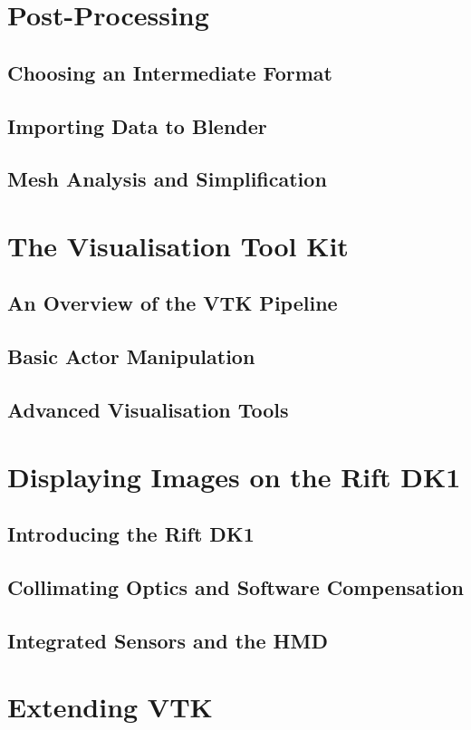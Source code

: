 \documentclass[MSc,paper=a4,pagesize=auto, doublespacing]{icldt}
\begin{document}
\chapter{Post-Processing}
\section{Choosing an Intermediate Format}
\section{Importing Data to Blender}
\section{Mesh Analysis and Simplification}

\chapter{The Visualisation Tool Kit}
\section{An Overview of the VTK Pipeline}
\section{Basic Actor Manipulation}
\section{Advanced Visualisation Tools}

\chapter{Displaying Images on the Rift DK1}
\section{Introducing the Rift DK1}
\section{Collimating Optics and Software Compensation}
\section{Integrated Sensors and the HMD}

\chapter{Extending VTK}
\end{document}
